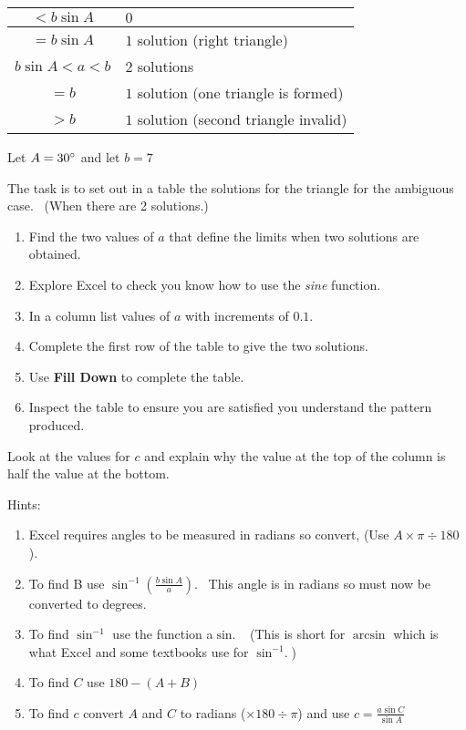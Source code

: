\qquad \qquad \qquad \qquad \qquad
\begin{tabular}[c]{|c|l|}\hline
$ <b \sin  A$  & $0$  \\
\hline
$ =b \sin  A$  & $1$ solution (right triangle)  \\
\hline
$b \sin  A <a <b$  & $2$ solutions  \\
\hline
$ =b$  & $1$ solution (one triangle is formed)  \\
\hline
$ >b$  & $1$ solution (second triangle invalid)  \\
\hline
\end{tabular}

Let $A =30 \mbox{{\ensuremath{{}^\circ}}}$ and let $b =7$ 

The task is to set out in a table the solutions for the triangle for the ambiguous case. \ (When
there are 2 solutions.) 


\begin{enumerate}
\item Find the two values of $a$ that define the limits when two solutions are obtained. 

\item Explore Excel
to check you know how to use the \emph{sine} function. 

\item In a column list values
of $a$ with increments of $0.1\text{.}$ 

\item Complete the first row of the table to give the two solutions.


\item Use \textbf{Fill Down} to complete the table. 

\item Inspect
the table to ensure you are satisfied you understand the pattern produced. \end{enumerate}


Look at the
values for $c$ and explain why the value at the top of the column is half the value at the bottom. 

Hints: 


\begin{enumerate}
\item Excel requires angles to be measured in radians so convert, (Use $A \times \pi  \div 180$). 

\item To find B use $\sin ^{ -1} \genfrac{(}{)}{}{}{b \sin  A}{a}$. \ This angle is in radians so must now be converted to degrees. 

\item To
find $\sin ^{ -1}$ use the function a$\sin \text{.}$ \ (This is short for $\arcsin $ which is what Excel and some textbooks use for $\sin ^{ -1}\text{.}$) 

\item To find $C$ use $180 -(A +B)$ 

\item To find $c$ convert $A$ and $C$ to radians ($ \times 180 \div \pi $) and use $c =\frac{a \sin  C}{\sin  A}$ \end{enumerate}


